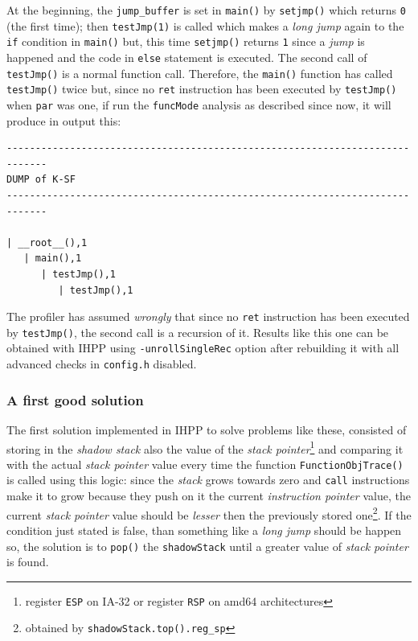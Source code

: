 \documentclass[a4paper,10pt]{report}
\begin{document}
\noindent
At the beginning, the \verb|jump_buffer| is set in \verb|main()| by \verb|setjmp()| 
which returns \verb|0| (the first time); 
then \verb|testJmp(1)| is called which makes a \emph{long jump} 
again to the \verb|if| condition in \verb|main()| but, this time \verb|setjmp()| returns
\verb|1| since a \emph{jump} is happened and the code in \verb|else| statement 
is executed. The second call of \verb|testJmp()| is a normal function call.
Therefore, the \verb|main()| function has called \verb|testJmp()| twice but, 
since no \verb|ret| instruction has been executed by \verb|testJmp()| when \verb|par| 
was one, if run the \verb|funcMode| analysis as described since now, it will produce 
in output this:

\begin{lstlisting}[label=longjmp_ex_1, caption={an example of the \emph{longjmp} problem}]
-----------------------------------------------------------------------------
DUMP of K-SF
-----------------------------------------------------------------------------

| __root__(),1
   | main(),1
      | testJmp(),1
         | testJmp(),1
\end{lstlisting}

\noindent
The profiler has assumed \emph{wrongly} that since no \verb|ret| instruction 
has been executed by \verb|testJmp()|, the second call is a recursion of it.
Results like this one can be obtained with IHPP using \verb|-unrollSingleRec| option 
after rebuilding it with all advanced checks in \verb|config.h| disabled.

\subsubsection{A first good solution}
The first solution implemented in IHPP to solve problems like these, 
consisted of storing in the \emph{shadow stack} also 
the value of the \emph{stack pointer}\footnote{register \texttt{ESP} on IA-32 or register \texttt{RSP} on amd64 architectures} and comparing it with the actual \emph{stack pointer}
value every time the function \verb|FunctionObjTrace()| is called using this logic:
since the \emph{stack} grows towards zero and \verb|call| instructions make 
it to grow because they push on it the current \emph{instruction pointer} value, 
the current \emph{stack pointer} value should be \emph{lesser} then the previously 
stored one\footnote{obtained by \texttt{shadowStack.top().reg\_sp}}. 
If the condition just stated is false, than something like a \emph{long jump} should be
happen so, the solution is to \verb|pop()| the \verb|shadowStack| until a greater
value of \emph{stack pointer} is found. 
\end{document}
